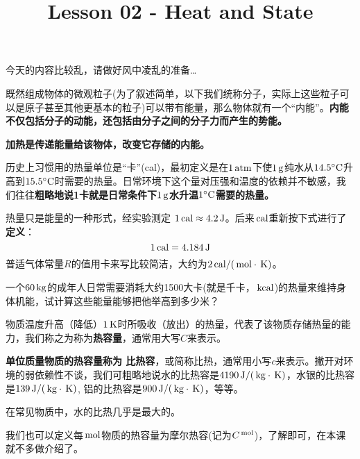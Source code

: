 \documentclass[CJK]{beamer}
\title{Lesson 02 - Heat and State}
\author{}
\date{}
\begin{document}

\begin{frame}
\bch
今天的内容比较乱，请做好风中凌乱的准备…
\ech
\end{frame}

\begin{frame}
\bch
\bitem
\item{既然组成物体的微观粒子(为了叙述简单，以下我们统称分子，实际上这些粒子可以是原子甚至其他更基本的粒子)可以带有能量，那么物体就有一个“内能”。{\bf 内能不仅包括分子的动能，还包括由分子之间的分子力而产生的势能。}}
\item{\bf 加热是传递能量给该物体，改变它存储的内能。}
\item{历史上习惯用的热量单位是“卡”(cal)，最初定义是在$1\,\mathrm{atm}$下使$1\,\mathrm{g}$纯水从$14.5^\circ \mathrm{C}$升高到$15.5^\circ \mathrm{C}$时需要的热量。日常环境下这个量对压强和温度的依赖并不敏感，我们往往{\bf 粗略地说1卡就是日常条件下$1\,\mathrm{g}$水升温$1^\circ \mathrm{C}$需要的热量。}}
\item{热量只是能量的一种形式，经实验测定 $1\,\mathrm{cal} \approx 4.2\,\mathrm{J}$。后来$\,\mathrm{cal}$重新按下式进行了{\bf 定义}：
$$1\,\mathrm{cal} = 4.184 \,\mathrm{J}$$
普适气体常量$R$的值用卡来写比较简洁，大约为$2\,\mathrm{cal}/(\,\mathrm{mol}\cdot\,\mathrm{K})$。}
\eitem

\ech
\end{frame}

\begin{frame}
\bch
一个$60\,\mathrm{kg}$的成年人日常需要消耗大约1500大卡(就是千卡，$\,\mathrm{kcal}$)的热量来维持身体机能，试计算这些能量能够把他举高到多少米？
\ech
\end{frame}



\begin{frame}
\bch
\bitem
\item{物质温度升高（降低）$1\,\mathrm{K}$时所吸收（放出）的热量，代表了该物质存储热量的能力，我们称之为称为{\bf 热容量}，通常用大写$C$来表示。}
\item{{\bf 单位质量物质的热容量称为 比热容}，或简称比热，通常用小写$c$来表示。撇开对环境的弱依赖性不谈，我们可粗略地说水的比热容是$4190\,\mathrm{J}/(\,\mathrm{kg}\cdot\,\mathrm{K})$，水银的比热容是$139\,\mathrm{J}/(\,\mathrm{kg}\cdot\,\mathrm{K})$, 铝的比热容是$900\,\mathrm{J}/(\,\mathrm{kg}\cdot\,\mathrm{K})$，等等。}
\item{在常见物质中，水的比热几乎是最大的。}
\item{我们也可以定义每$\,\mathrm{mol}$物质的热容量为摩尔热容(记为$C^{\,\mathrm{mol}}$)，了解即可，在本课就不多做介绍了。}
\eitem
\ech
\end{frame}
\end{document}

